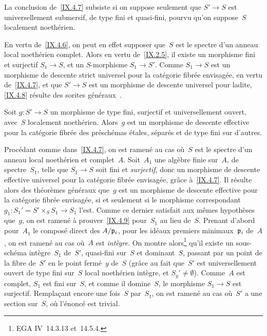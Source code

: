 \begin{corollaire}
\label{IX.4.8}
La conclusion de~\ref{IX.4.7} subsiste si on suppose seulement que
$S'\to S$ est universellement submersif, de type fini et quasi-fini,
pourvu qu'on suppose~$S$ localement noeth\'erien.
\end{corollaire}

En
vertu de~\ref{IX.4.6}, on peut en effet supposer que~$S$ est le
spectre d'un anneau local noeth\'erien complet. Alors en vertu
de~\ref{IX.2.5}, il existe un morphisme fini et surjectif $S_1\to S$,
et un $S$-morphisme $S_1\to S'$. Comme $S_1\to S$ est un morphisme de
descente strict universel pour la cat\'egorie fibr\'ee
envisag\'ee, en vertu de~\ref{IX.4.7}, et que $S'\to S$ est un
morphisme de descente universel pour ladite, \ref{IX.4.8} r\'esulte
des sorites g\'en\'eraux~\cite{IX.D}.

\begin{corollaire}
\label{IX.4.9}
Soit $g\colon S'\to S$ un morphisme de type fini, surjectif et
universellement ouvert, avec~$S$ localement noeth\'erien. Alors~$g$
est un morphisme de descente effective pour la cat\'egorie
fibr\'ee des pr\'esch\'emas \'etales, s\'epar\'es et de
type fini sur d'autres.
\end{corollaire}

Proc\'edant comme dans~\ref{IX.4.7}, on est ramen\'e au cas
o\`u~$S$ est le spectre d'un anneau local noeth\'erien et
complet~$A$. Soit~$A_1$ une alg\`ebre finie sur~$A$, de
spectre~$S_1$, telle que $S_1\to S$ soit fini et \emph{surjectif},
donc un morphisme de descente effective universel pour la
cat\'egorie fibr\'ee envisag\'ee, gr\^ace \`a~\ref{IX.4.7}.
Il r\'esulte alors des th\'eor\`emes g\'en\'eraux \cite{IX.D}
que~$g$ est un morphisme de descente effective pour la cat\'egorie
fibr\'ee envisag\'ee, si et seulement si le morphisme
correspondant $g_1\colon S_1'=S'\times_S S_1\to S_1$ l'est. Comme ce
dernier satisfait aux m\^emes hypoth\`eses que~$g$, on est
ramen\'e \`a prouver~\ref{IX.4.9} pour~$S_1$ au lieu de~$S$.
Prenant d'abord pour~$A_1$ le compos\'e direct des $A/\mathfrak{p}_i$,
pour les id\'eaux premiers minimaux~$\mathfrak{p}_i$ de~$A$, on est
ramen\'e au cas o\`u~$A$ est \emph{intègre}. On montre
alors\footnote{\Cf EGA IV~14.3.13 et~14.5.4.} qu'il existe un
sous-sch\'ema int\`egre~$S_1$ de~$S'$, quasi-fini sur~$S$ et
dominant~$S$, passant par un point de la fibre de~$S'$ en le point
ferm\'e~$y$ de~$S$ (gr\^ace au fait que~$S'$ est universellement
ouvert de type fini sur~$S$ local noeth\'erien int\`egre, et
$S_y'\neq\emptyset$). Comme~$A$ est complet, $S_1$ est fini sur~$S$,
et comme il domine~$S$, le morphisme $S_1\to S$ est surjectif.
Rempla\c cant encore une fois~$S$ par~$S_1$, on est ramen\'e au
cas o\`u~$S'$ a une section sur~$S$, o\`u l'\'enonc\'e est
trivial.

